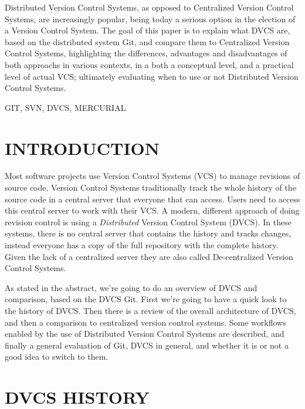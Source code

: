 \abstract
%
%
Distributed Version Control Systems, as opposed to Centralized Version Control Systems, 
are increasingly popular, being today a serious option in the election of a Version
Control System.
The goal of this paper is to explain what DVCS are, based on the distributed system Git, 
and compare them to Centralized Version Control Systems,
highlighting the differences, advantages and disadvantages of both approachs in various 
contexts, in a both a conceptual level, and a practical level of actual VCS; ultimately 
evaluating when to use or not Distributed Version Control Systems. 
\endabstract

\keywords%
GIT, SVN, DVCS, MERCURIAL
\endkeywords

\section{INTRODUCTION}

Most software projects use Version Control Systems (VCS) to manage revisions
of source code. 
Version Control Systems traditionally track the whole history of the
source code in a central server that everyone that can access. 
Users need to access this central server to work with their VCS.
A modern, different approach of doing revision control is using a \emph{Distributed} Version Control System (DVCS).
In these systems, there is no central server that contains the history and tracks changes,
instead everyone has a copy of the full repository with the complete history.
Given the lack of a centralized server they are also called De-centralized Version Control Systems. 

As stated in the abstract, we're going to do an overview of DVCS and comparison, based on the DVCS Git. 
First we're going to have a quick look to the history of DVCS. Then there is a review of the overall architecture of DVCS, and then a comparison to centralized version control systems. Some workflows enabled by the use of Distributed Version Control Systems are described, and finally a general evaluation of Git, DVCS in general, and whether it is or not a good idea to switch to them. 

\section{DVCS HISTORY}

